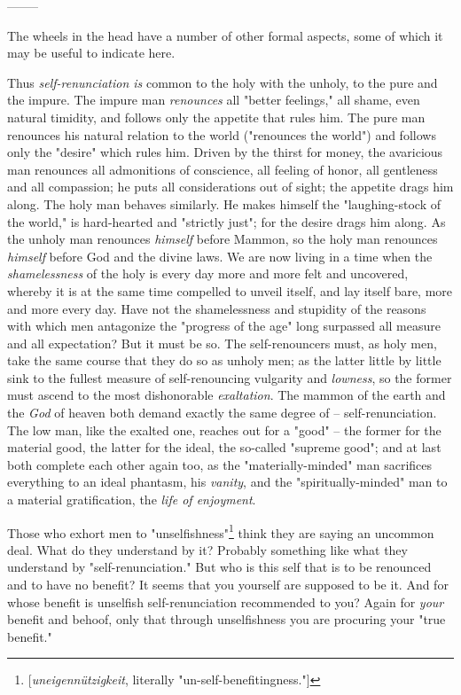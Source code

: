 \documentclass[a4paper]{book}
\begin{document}
\begin{center}
--------\end{center}


The wheels in the head have a number of other formal aspects, some of which it 
may be useful to indicate here.

Thus \textit{self-renunciation is} common to the holy with the unholy, to the 
pure and the impure. The impure man \textit{renounces} all "{}better 
feelings,"{} all shame, even natural timidity, and follows only the appetite 
that rules him. The pure man renounces his natural relation to the world 
("{}renounces the world"{}) and follows only the "{}desire"{} which rules him. 
Driven by the thirst for money, the avaricious man renounces all admonitions 
of conscience, all feeling of honor, all gentleness and all compassion; he 
puts all considerations out of sight; the appetite drags him along. The holy 
man behaves similarly. He makes himself the "{}laughing-stock of the world,"{} 
is hard-hearted and "{}strictly just"{}; for the desire drags him along. As 
the unholy man renounces \textit{himself} before Mammon, so the holy man 
renounces \textit{himself} before God and the divine laws. We are now living 
in a time when the \textit{shamelessness} of the holy is every day more and 
more felt and uncovered, whereby it is at the same time compelled to unveil 
itself, and lay itself bare, more and more every day. Have not the 
shamelessness and stupidity of the reasons with which men antagonize the 
"{}progress of the age"{} long surpassed all measure and all expectation? But 
it must be so. The self-renouncers must, as holy men, take the same course 
that they do so as unholy men; as the latter little by little sink to the 
fullest measure of self-renouncing vulgarity and \textit{lowness}, so the 
former must ascend to the most dishonorable \textit{exaltation}. The mammon of 
the earth and the \textit{God} of heaven both demand exactly the same degree 
of -- self-renunciation. The low man, like the exalted one, reaches out for a 
"{}good"{} -- the former for the material good, the latter for the ideal, the 
so-called "{}supreme good"{}; and at last both complete each other again too, 
as the "{}materially-minded"{} man sacrifices everything to an ideal phantasm, 
his \textit{vanity}, and the "{}spiritually-minded"{} man to a material 
gratification, the \textit{life of enjoyment}.

Those who exhort men to 
"{}unselfishness"{}\footnote{[\textit{uneigenn\"utzigkeit}, literally 
"{}un-self-benefitingness."{}]} think they are saying an uncommon deal. What 
do they understand by it? Probably something like what they understand by 
"{}self-renunciation."{} But who is this self that is to be renounced and to 
have no benefit? It seems that you yourself are supposed to be it. And for 
whose benefit is unselfish self-renunciation recommended to you? Again for 
\textit{your} benefit and behoof, only that through unselfishness you are 
procuring your "{}true benefit."{}
\end{document}
